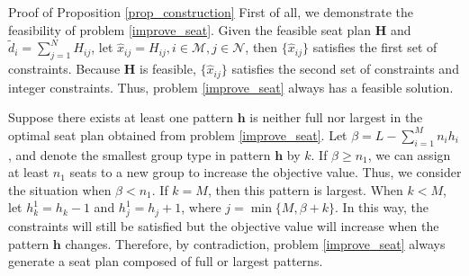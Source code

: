 \begin{pf}{Proof of Proposition \ref{prop_construction}}
  First of all, we demonstrate the feasibility of problem \eqref{improve_seat}. Given the feasible seat plan $\bm{H}$ and $\tilde{d}_{i} = \sum_{j=1}^{N} H_{ij}$, let $\hat{x}_{ij} = H_{ij}, i \in \mathcal{M}, j \in \mathcal{N}$, then $\{\hat{x}_{ij}\}$ satisfies the first set of constraints. Because $\bm{H}$ is feasible, $\{\hat{x}_{ij}\}$ satisfies the second set of constraints and integer constraints. Thus, problem \eqref{improve_seat} always has a feasible solution. 
  
  Suppose there exists at least one pattern $\bm{h}$ is neither full nor largest in the optimal seat plan obtained from problem \eqref{improve_seat}. Let $\beta = L - \sum_{i=1}^{M} n_{i} h_{i}$, and denote the smallest group type in pattern $\bm{h}$ by $k$. If $\beta \geq n_1$, we can assign at least $n_1$ seats to a new group to increase the objective value. Thus, we consider the situation when $\beta < n_1$. If $k =M$, then this pattern is largest. When $k< M$, let $h^{1}_{k} = h_{k} -1$ and $h^{1}_{j} = h_{j} +1$, where $j = \min\{M, \beta + k\}$. In this way, the constraints will still be satisfied but the objective value will increase when the pattern $\bm{h}$ changes. Therefore, by contradiction, problem \eqref{improve_seat} always generate a seat plan composed of full or largest patterns.
\end{pf}


